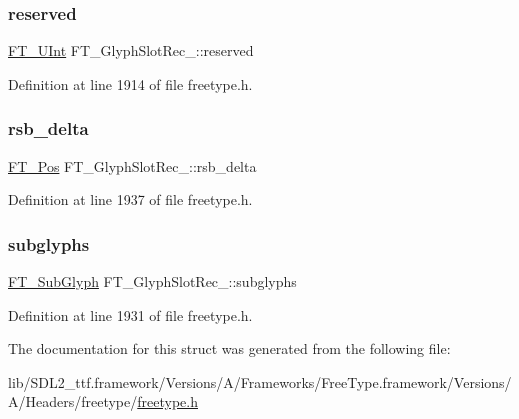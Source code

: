 \mbox{\label{struct_f_t___glyph_slot_rec___ae829996584939557dfe46c4e4f2b28a8}} 
\subsubsection{\texorpdfstring{reserved}{reserved}}
{\footnotesize\ttfamily \mbox{\hyperlink{fttypes_8h_abcb8db4dbf35d2b55a9e8c7b0926dc52}{F\+T\+\_\+\+U\+Int}} F\+T\+\_\+\+Glyph\+Slot\+Rec\+\_\+\+::reserved}



Definition at line 1914 of file freetype.\+h.

\mbox{\label{struct_f_t___glyph_slot_rec___a2ca5f5e7b92df3aee4584949fa6a2a1c}} 
\subsubsection{\texorpdfstring{rsb\_delta}{rsb\_delta}}
{\footnotesize\ttfamily \mbox{\hyperlink{ftimage_8h_af5f230f4b253d4c7715fd2e595614c90}{F\+T\+\_\+\+Pos}} F\+T\+\_\+\+Glyph\+Slot\+Rec\+\_\+\+::rsb\+\_\+delta}



Definition at line 1937 of file freetype.\+h.

\mbox{\label{struct_f_t___glyph_slot_rec___a295f5a3108399c4c0703e6ee2f88cc67}} 
\subsubsection{\texorpdfstring{subglyphs}{subglyphs}}
{\footnotesize\ttfamily \mbox{\hyperlink{freetype_8h_a0d03ab6cac878c81dca92e6a8c87a3a1}{F\+T\+\_\+\+Sub\+Glyph}} F\+T\+\_\+\+Glyph\+Slot\+Rec\+\_\+\+::subglyphs}



Definition at line 1931 of file freetype.\+h.



The documentation for this struct was generated from the following file\+:\begin{DoxyCompactItemize}
\item 
lib/\+S\+D\+L2\+\_\+ttf.\+framework/\+Versions/\+A/\+Frameworks/\+Free\+Type.\+framework/\+Versions/\+A/\+Headers/freetype/\mbox{\hyperlink{freetype_8h}{freetype.\+h}}\end{DoxyCompactItemize}
